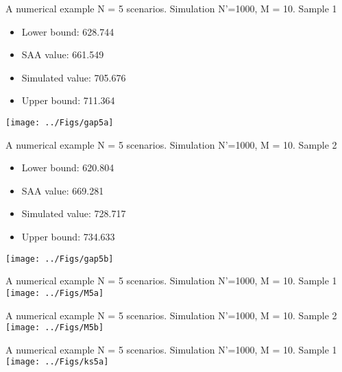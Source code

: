 \begin{frame}{A numerical example}
{N = 5 scenarios. Simulation N'=1000, M = 10. Sample 1}

\begin{itemize}
\item Lower bound: 628.744 

\item SAA value:  661.549 

\item Simulated value:  705.676 

\item Upper bound:  711.364 
\end{itemize}

\centering \texttt{[image: ../Figs/gap5a]}  
\end{frame}

\begin{frame}{A numerical example}
{N = 5 scenarios. Simulation N'=1000, M = 10. Sample 2}

\begin{itemize}
\item Lower bound: 620.804  

\item SAA value:  669.281 

\item Simulated value:  728.717  

\item Upper bound:  734.633 
\end{itemize}

\centering \texttt{[image: ../Figs/gap5b]}  
\end{frame}


\begin{frame}{A numerical example}
{N = 5 scenarios. Simulation N'=1000, M = 10. Sample 1}
\centering \texttt{[image: ../Figs/M5a]} 
\end{frame}

\begin{frame}{A numerical example}
{N = 5 scenarios. Simulation N'=1000, M = 10. Sample 2}
\centering \texttt{[image: ../Figs/M5b]} 
\end{frame}



\begin{frame}{A numerical example}
{N = 5 scenarios. Simulation N'=1000, M = 10. Sample 1}
\centering \texttt{[image: ../Figs/ks5a]} 
\end{frame}

